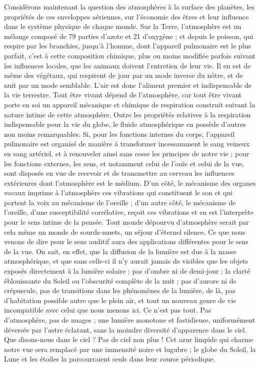 \documentclass[a4paper, 11pt, oneside]{article}
\begin{document}
Considérons maintenant la question des atmosphères à la surface des planètes, les propriétés de ces enveloppes aériennes, sur l'économie des êtres et leur influence dans le système physique de chaque monde. Sur la Terre, l'atmosphère est un mélange composé de 79 parties d'azote et 21 d'oxygène ; et depuis le poisson, qui respire par les branchies, jusqu'à l'homme, dont l'appareil pulmonaire est le plus parfait, c'est à cette composition chimique, plus ou moins modifiée parfois suivant les influences locales, que les animaux doivent l'entretien de leur vie. Il en est de même des végétaux, qui respirent de jour par un mode inverse du nôtre, et de nuit par un mode semblable. L'air est donc l'aliment premier et indispensable de la vie terrestre. Tout être vivant dépend de l'atmosphère, car tout être vivant porte en soi un appareil mécanique et chimique de respiration construit suivant la nature intime de cette atmosphère. Outre les propriétés relatives à la respiration indispensable pour la vie du globe, le fluide atmosphérique en possède d'autres non moins remarquables. Si, pour les fonctions internes du corps, l'appareil pulmonaire est organisé de manière à transformer incessamment le sang veineux en sang artériel, et à renouveler ainsi sans cesse les principes de notre vie ; pour les fonctions externes, les sens, et notamment celui de l'ouïe et celui de la vue, sont disposés en vue de recevoir et de transmettre au cerveau les influences extérieures dont l'atmosphère est le médium. D'un côté, le mécanisme des organes vocaux imprime à l'atmosphère ces vibrations qui constituent le son et qui portent la voix au mécanisme de l'oreille ; d'un autre côté, le mécanisme de l'oreille, d'une susceptibilité corrélative, reçoit ces vibrations et en est l'interprète pour le sens intime de la pensée. Tout monde dépourvu d'atmosphère serait par cela même un monde de sourds-muets, un séjour d'éternel silence. Ce que nous venons de dire pour le sens auditif aura des applications différentes pour le sens de la vue. On sait, en effet, que la diffusion de la lumière est due à la masse atmosphérique, et que sans celle-ci il n'y aurait jamais de visibles que les objets exposés directement à la lumière solaire ; pas d'ombre ni de demi-jour ; la clarté éblouissante du Soleil ou l'obscurité complète de la nuit ; pas d'aurore ni de crépuscule, pas de transitions dans les phénomènes de la lumière, de là, pas d'habitation possible autre que le plein air, et tout un nouveau genre de vie incompatible avec celui que nous menons ici. Ce n'est pas tout. Pas d'atmosphère, pas de nuages ; une lumière monotone et fastidieuse, uniformément déversée par l'astre éclatant, sans la moindre diversité d'apparence dans le ciel. Que disons-nous dans le ciel ? Pas de ciel non plus ! Cet azur limpide qui charme notre vue sera remplacé par une immensité noire et lugubre ; le globe du Soleil, la Lune et les étoiles la parcourraient seuls dans leur course périodique.
\end{document}
